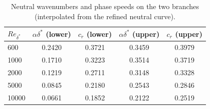\begin{table}[htbp]
  \centering
  \caption{Neutral wavenumbers and phase speeds on the two branches (interpolated from the refined neutral curve).}
  \label{tab:neutral_points}
  \begin{tabular}{lcccc}
    \toprule
    $Re_{\delta^*}$ & $\alpha\delta^*$ (lower) & $c_r$ (lower) & $\alpha\delta^*$ (upper) & $c_r$ (upper) \\
    \midrule
    600 & 0.2420 & 0.3721 & 0.3459 & 0.3979 \\
    1000 & 0.1710 & 0.3223 & 0.3514 & 0.3719 \\
    2000 & 0.1219 & 0.2711 & 0.3148 & 0.3328 \\
    5000 & 0.0845 & 0.2180 & 0.2543 & 0.2846 \\
    10000 & 0.0661 & 0.1852 & 0.2122 & 0.2519 \\
    \bottomrule
  \end{tabular}
\end{table}
